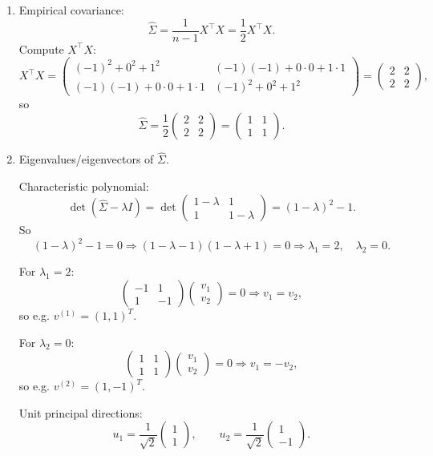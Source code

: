 \documentclass[11pt]{article}
\begin{document}
\begin{enumerate}
\item Empirical covariance:
\[
\widehat{\Sigma} = \frac{1}{n-1} X^\top X = \frac12 X^\top X.
\]
Compute $X^\top X$:
\[
X^\top X =
\begin{pmatrix}
(-1)^2+0^2+1^2 & (-1)(-1)+0\cdot0+1\cdot1\\
(-1)(-1)+0\cdot0+1\cdot1 & (-1)^2+0^2+1^2
\end{pmatrix}
=
\begin{pmatrix}
2 & 2\\
2 & 2
\end{pmatrix},
\]
so
\[
\widehat{\Sigma} = \frac12
\begin{pmatrix}
2 & 2\\
2 & 2
\end{pmatrix}
=
\begin{pmatrix}
1 & 1\\
1 & 1
\end{pmatrix}.
\]

\item Eigenvalues/eigenvectors of $\widehat{\Sigma}$.

Characteristic polynomial:
\[
\det(\widehat{\Sigma}-\lambda I)
=
\det\begin{pmatrix}
1-\lambda & 1\\
1 & 1-\lambda
\end{pmatrix}
=
(1-\lambda)^2 - 1.
\]
So
\[
(1-\lambda)^2 - 1 = 0
\Rightarrow
(1-\lambda-1)(1-\lambda+1)=0
\Rightarrow
\lambda_1=2,\quad \lambda_2=0.
\]

For $\lambda_1=2$:
\[
\begin{pmatrix}
-1 & 1\\
1 & -1
\end{pmatrix}
\begin{pmatrix}v_1\\v_2\end{pmatrix}=0
\Rightarrow v_1=v_2,
\]
so e.g. $v^{(1)}=(1,1)^T$.

For $\lambda_2=0$:
\[
\begin{pmatrix}
1 & 1\\
1 & 1
\end{pmatrix}
\begin{pmatrix}v_1\\v_2\end{pmatrix}=0
\Rightarrow v_1=-v_2,
\]
so e.g. $v^{(2)}=(1,-1)^T$.

Unit principal directions:
\[
u_1 = \frac{1}{\sqrt{2}}\begin{pmatrix}1\\1\end{pmatrix},
\qquad
u_2 = \frac{1}{\sqrt{2}}\begin{pmatrix}1\\-1\end{pmatrix}.
\]


\end{enumerate}
\end{document}
